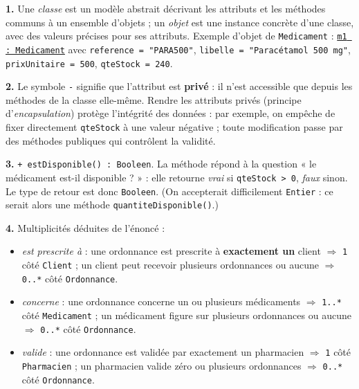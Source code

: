 \documentclass[11pt]{article}
\begin{document}
\begin{corrige}
\textbf{1.} Une \emph{classe} est un modèle abstrait décrivant les attributs et les méthodes communs à un ensemble d'objets ; un \emph{objet} est une instance concrète d'une classe, avec des valeurs précises pour ses attributs. Exemple d'objet de \texttt{Medicament} : \texttt{\underline{m1 : Medicament}} avec \texttt{reference = "PARA500"}, \texttt{libelle = "Paracétamol 500 mg"}, \texttt{prixUnitaire = 500}, \texttt{qteStock = 240}.

\textbf{2.} Le symbole \texttt{-} signifie que l'attribut est \textbf{privé} : il n'est accessible que depuis les méthodes de la classe elle-même. Rendre les attributs privés (principe d'\emph{encapsulation}) protège l'intégrité des données : par exemple, on empêche de fixer directement \texttt{qteStock} à une valeur négative ; toute modification passe par des méthodes publiques qui contrôlent la validité.

\textbf{3.} \texttt{+ estDisponible() : Booleen}. La méthode répond à la question « le médicament est-il disponible ? » : elle retourne \emph{vrai} si \texttt{qteStock > 0}, \emph{faux} sinon. Le type de retour est donc \texttt{Booleen}. (On accepterait difficilement \texttt{Entier} : ce serait alors une méthode \texttt{quantiteDisponible()}.)

\textbf{4.} Multiplicités déduites de l'énoncé :
\begin{itemize}
  \item \emph{est prescrite à} : une ordonnance est prescrite à \textbf{exactement un} client $\Rightarrow$ \texttt{1} côté \texttt{Client} ; un client peut recevoir plusieurs ordonnances ou aucune $\Rightarrow$ \texttt{0..*} côté \texttt{Ordonnance}.
  \item \emph{concerne} : une ordonnance concerne un ou plusieurs médicaments $\Rightarrow$ \texttt{1..*} côté \texttt{Medicament} ; un médicament figure sur plusieurs ordonnances ou aucune $\Rightarrow$ \texttt{0..*} côté \texttt{Ordonnance}.
  \item \emph{valide} : une ordonnance est validée par exactement un pharmacien $\Rightarrow$ \texttt{1} côté \texttt{Pharmacien} ; un pharmacien valide zéro ou plusieurs ordonnances $\Rightarrow$ \texttt{0..*} côté \texttt{Ordonnance}.
\end{itemize}


\end{corrige}
\end{document}
